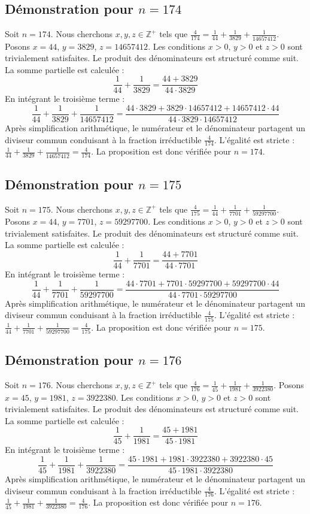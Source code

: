 \documentclass[11pt,a4paper]{article}
\begin{document}
\subsection{Démonstration pour $n = 174$}
Soit $n = 174$. Nous cherchons $x, y, z \in \mathbb{Z}^{+}$ tels que $\frac{4}{174} = \frac{1}{44} + \frac{1}{3829} + \frac{1}{14657412}$.
Posons $x = 44$, $y = 3829$, $z = 14657412$.
Les conditions $x > 0$, $y > 0$ et $z > 0$ sont trivialement satisfaites.
Le produit des dénominateurs est structuré comme suit. La somme partielle est calculée :
$$ \frac{1}{44} + \frac{1}{3829} = \frac{44+3829}{44 \cdot 3829} $$
En intégrant le troisième terme :
$$ \frac{1}{44} + \frac{1}{3829} + \frac{1}{14657412} = \frac{44 \cdot 3829 + 3829 \cdot 14657412 + 14657412 \cdot 44}{44 \cdot 3829 \cdot 14657412} $$
Après simplification arithmétique, le numérateur et le dénominateur partagent un diviseur commun conduisant à la fraction irréductible $\frac{4}{174}$.
L'égalité est stricte : $\frac{1}{44} + \frac{1}{3829} + \frac{1}{14657412} = \frac{4}{174}$.
La proposition est donc vérifiée pour $n = 174$.
\subsection{Démonstration pour $n = 175$}
Soit $n = 175$. Nous cherchons $x, y, z \in \mathbb{Z}^{+}$ tels que $\frac{4}{175} = \frac{1}{44} + \frac{1}{7701} + \frac{1}{59297700}$.
Posons $x = 44$, $y = 7701$, $z = 59297700$.
Les conditions $x > 0$, $y > 0$ et $z > 0$ sont trivialement satisfaites.
Le produit des dénominateurs est structuré comme suit. La somme partielle est calculée :
$$ \frac{1}{44} + \frac{1}{7701} = \frac{44+7701}{44 \cdot 7701} $$
En intégrant le troisième terme :
$$ \frac{1}{44} + \frac{1}{7701} + \frac{1}{59297700} = \frac{44 \cdot 7701 + 7701 \cdot 59297700 + 59297700 \cdot 44}{44 \cdot 7701 \cdot 59297700} $$
Après simplification arithmétique, le numérateur et le dénominateur partagent un diviseur commun conduisant à la fraction irréductible $\frac{4}{175}$.
L'égalité est stricte : $\frac{1}{44} + \frac{1}{7701} + \frac{1}{59297700} = \frac{4}{175}$.
La proposition est donc vérifiée pour $n = 175$.
\subsection{Démonstration pour $n = 176$}
Soit $n = 176$. Nous cherchons $x, y, z \in \mathbb{Z}^{+}$ tels que $\frac{4}{176} = \frac{1}{45} + \frac{1}{1981} + \frac{1}{3922380}$.
Posons $x = 45$, $y = 1981$, $z = 3922380$.
Les conditions $x > 0$, $y > 0$ et $z > 0$ sont trivialement satisfaites.
Le produit des dénominateurs est structuré comme suit. La somme partielle est calculée :
$$ \frac{1}{45} + \frac{1}{1981} = \frac{45+1981}{45 \cdot 1981} $$
En intégrant le troisième terme :
$$ \frac{1}{45} + \frac{1}{1981} + \frac{1}{3922380} = \frac{45 \cdot 1981 + 1981 \cdot 3922380 + 3922380 \cdot 45}{45 \cdot 1981 \cdot 3922380} $$
Après simplification arithmétique, le numérateur et le dénominateur partagent un diviseur commun conduisant à la fraction irréductible $\frac{4}{176}$.
L'égalité est stricte : $\frac{1}{45} + \frac{1}{1981} + \frac{1}{3922380} = \frac{4}{176}$.
La proposition est donc vérifiée pour $n = 176$.
\end{document}
